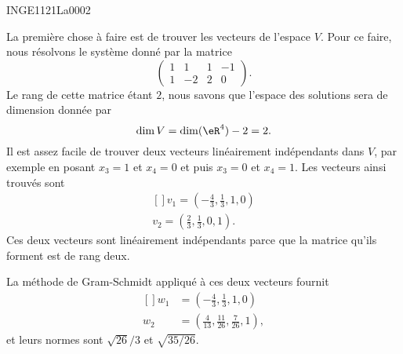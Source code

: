 

\begin{corrige}{INGE1121La0002}

	La première chose à faire est de trouver les vecteurs de l'espace $V$. Pour ce faire, nous résolvons le système donné par la matrice
	\begin{equation}
		\begin{pmatrix}
			1	&	1	&	1	&	-1	\\
			1	&	-2	&	2	&	0
		\end{pmatrix}.
	\end{equation}
	Le rang de cette matrice étant $2$, nous savons que l'espace des solutions sera de dimension donnée par
	\begin{equation}
		\dim V=\dim(\eR^4)-2=2.
	\end{equation}
	Il est assez facile de trouver deux vecteurs linéairement indépendants dans $V$, par exemple en posant $x_3=1$ et $x_4=0$ et puis $x_3=0$ et $x_4=1$. Les vecteurs ainsi trouvés sont
	\begin{equation}
		\begin{aligned}[]
			v_1=(-\frac{ 4 }{ 3 },\frac{1}{ 3 },1,0)\\
			v_2=(\frac{ 2 }{ 3 },\frac{1}{ 3 },0,1).
		\end{aligned}
	\end{equation}
	Ces deux vecteurs sont linéairement indépendants parce que la matrice qu'ils forment est de rang deux.

	La méthode de Gram-Schmidt appliqué à ces deux vecteurs fournit
	\begin{equation}
		\begin{aligned}[]
			w_1&=(-\frac{ 4 }{ 3 },\frac{1}{ 3 },1,0)\\
			w_2&=(\frac{ 4 }{ 13 },\frac{ 11 }{ 26 },\frac{ 7 }{ 26 },1),
		\end{aligned}
	\end{equation}
	et leurs normes sont $\sqrt{26}/3$ et $\sqrt{35/26}$.

\end{corrige}
